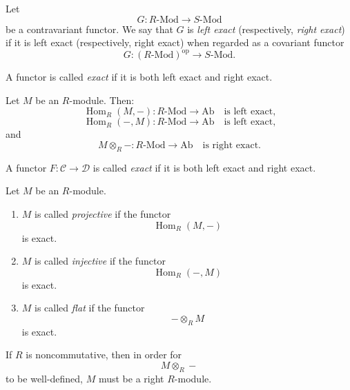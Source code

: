 \begin{definition}
    Let
    \[
        G: R\text{-}\mathrm{Mod} \to S\text{-}\mathrm{Mod}
    \]
    be a contravariant functor. We say that $G$ is \emph{left exact} (respectively, \emph{right exact}) if it is left exact (respectively, right exact) when regarded as a covariant functor
    \[
        G : (R\text{-}\mathrm{Mod})^{\mathrm{op}} \to S\text{-}\mathrm{Mod}.
    \]

    A functor is called \emph{exact} if it is both left exact and right exact.
\end{definition}

Let $M$ be an $R$-module. Then:
\[
    \operatorname{Hom}_R(M,-): R\text{-}\mathrm{Mod} \to \mathrm{Ab}
    \quad\text{is left exact,}
\]
\[
    \operatorname{Hom}_R(-,M): R\text{-}\mathrm{Mod} \to \mathrm{Ab}
    \quad\text{is left exact,}
\]
and
\[
    M \otimes_R - : R\text{-}\mathrm{Mod} \to \mathrm{Ab}
    \quad\text{is right exact.}
\]

\begin{definition}
    A functor $F: \mathcal C \to \mathcal D$ is called \emph{exact} if it is both left exact and right exact.
\end{definition}

\begin{definition}
    Let $M$ be an $R$-module.

    \begin{enumerate}
        \item $M$ is called \emph{projective} if the functor
              \[
                  \operatorname{Hom}_R(M,-)
              \]
              is exact.

        \item $M$ is called \emph{injective} if the functor
              \[
                  \operatorname{Hom}_R(-,M)
              \]
              is exact.

        \item $M$ is called \emph{flat} if the functor
              \[
                  -\otimes_R M
              \]
              is exact.
    \end{enumerate}

    If $R$ is noncommutative, then in order for
    \[
        M\otimes_R -
    \]
    to be well-defined, $M$ must be a right $R$-module.
\end{definition}

